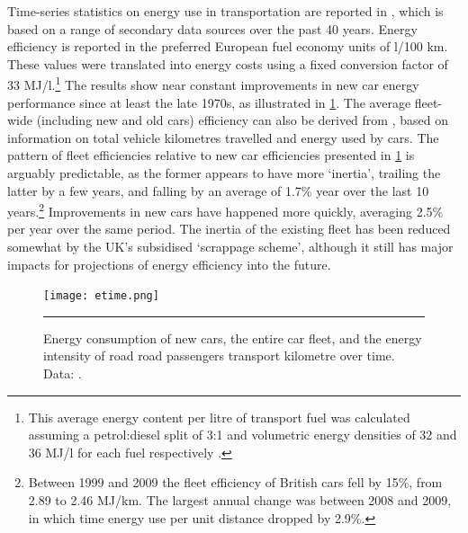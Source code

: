 Time-series statistics on energy use in transportation are
reported in \citet{Decc2011t}, which is based on a range of secondary data
sources over the past 40 years. Energy efficiency is reported in
the preferred European fuel economy units of l/100 km.
These values were translated into energy costs using a fixed conversion
factor of
33 MJ/l.\footnote{This
average energy content per litre of transport fuel was calculated
assuming a petrol:diesel split of 3:1 and volumetric energy densities
of 32 and 36 MJ/l for each fuel respectively \citep{Mj322010}.
}
The results show near constant improvements in new car energy performance
since at least the late 1970s, as illustrated in \cref{fig:etime}.
The average fleet-wide (including new and
old cars) efficiency can also be derived from \citet{Decc2011t}, based on
information on total vehicle kilometres travelled and energy used by cars.
The pattern of fleet efficiencies relative to new car efficiencies
presented in \cref{fig:etime} is arguably predictable, as the former
appears to have more `inertia', trailing the latter
by a few years, and falling by an average of 1.7\% year over the last 10
years.\footnote{Between 1999 and 2009 the fleet
efficiency of British cars fell by 15\%, from 2.89 to 2.46 MJ/km. The largest
annual change was  between 2008 and 2009, in which time energy use
per unit distance dropped by 2.9\%.
}
Improvements in new cars have happened more quickly, averaging 2.5\% per year
over the same period. The inertia of the existing fleet has been reduced
somewhat by the UK's subsidised `scrappage scheme', although it still has
major impacts for projections of energy efficiency into the future. 
\begin{figure}[h]
  \centerline{
    \texttt{[image: etime.png]}}
    \rule{35em}{0.5pt}
  \caption[Fleet efficiency of UK vehicles over time]{Energy consumption of new
cars, the entire car fleet, and the energy intensity of road road passengers
transport kilometre over time. Data: \citep{Decc2011t}.}
  \label{fig:etime}
\end{figure}

